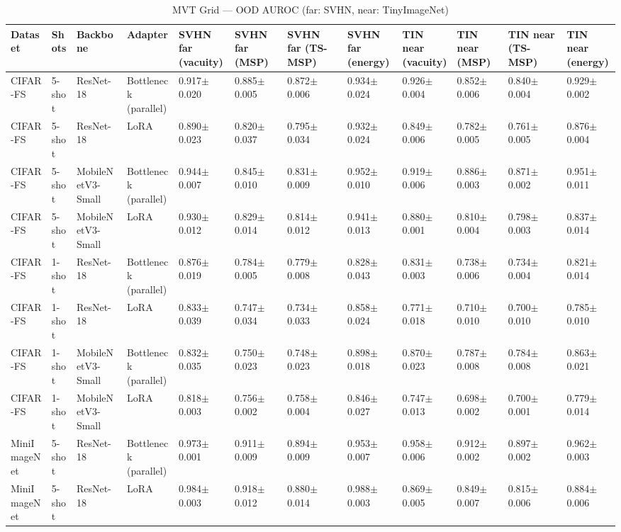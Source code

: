 \begin{table}[t]
\centering
\caption{MVT Grid — OOD AUROC (far: SVHN, near: TinyImageNet)}
\begin{tabular}{llllllllllll}
\toprule
Dataset & Shots & Backbone & Adapter & SVHN far (vacuity) & SVHN far (MSP) & SVHN far (TS-MSP) & SVHN far (energy) & TIN near (vacuity) & TIN near (MSP) & TIN near (TS-MSP) & TIN near (energy) \\
\midrule
CIFAR-FS & 5-shot & ResNet-18 & Bottleneck (parallel) & 0.917$\pm$0.020 & 0.885$\pm$0.005 & 0.872$\pm$0.006 & 0.934$\pm$0.024 & 0.926$\pm$0.004 & 0.852$\pm$0.006 & 0.840$\pm$0.004 & 0.929$\pm$0.002 \\
CIFAR-FS & 5-shot & ResNet-18 & LoRA & 0.890$\pm$0.023 & 0.820$\pm$0.037 & 0.795$\pm$0.034 & 0.932$\pm$0.024 & 0.849$\pm$0.006 & 0.782$\pm$0.005 & 0.761$\pm$0.005 & 0.876$\pm$0.004 \\
CIFAR-FS & 5-shot & MobileNetV3-Small & Bottleneck (parallel) & 0.944$\pm$0.007 & 0.845$\pm$0.010 & 0.831$\pm$0.009 & 0.952$\pm$0.010 & 0.919$\pm$0.006 & 0.886$\pm$0.003 & 0.871$\pm$0.002 & 0.951$\pm$0.011 \\
CIFAR-FS & 5-shot & MobileNetV3-Small & LoRA & 0.930$\pm$0.012 & 0.829$\pm$0.014 & 0.814$\pm$0.012 & 0.941$\pm$0.013 & 0.880$\pm$0.001 & 0.810$\pm$0.004 & 0.798$\pm$0.003 & 0.837$\pm$0.014 \\
CIFAR-FS & 1-shot & ResNet-18 & Bottleneck (parallel) & 0.876$\pm$0.019 & 0.784$\pm$0.005 & 0.779$\pm$0.008 & 0.828$\pm$0.043 & 0.831$\pm$0.003 & 0.738$\pm$0.006 & 0.734$\pm$0.004 & 0.821$\pm$0.014 \\
CIFAR-FS & 1-shot & ResNet-18 & LoRA & 0.833$\pm$0.039 & 0.747$\pm$0.034 & 0.734$\pm$0.033 & 0.858$\pm$0.024 & 0.771$\pm$0.018 & 0.710$\pm$0.010 & 0.700$\pm$0.010 & 0.785$\pm$0.010 \\
CIFAR-FS & 1-shot & MobileNetV3-Small & Bottleneck (parallel) & 0.832$\pm$0.035 & 0.750$\pm$0.023 & 0.748$\pm$0.023 & 0.898$\pm$0.018 & 0.870$\pm$0.023 & 0.787$\pm$0.008 & 0.784$\pm$0.008 & 0.863$\pm$0.021 \\
CIFAR-FS & 1-shot & MobileNetV3-Small & LoRA & 0.818$\pm$0.003 & 0.756$\pm$0.002 & 0.758$\pm$0.004 & 0.846$\pm$0.027 & 0.747$\pm$0.013 & 0.698$\pm$0.002 & 0.700$\pm$0.001 & 0.779$\pm$0.014 \\
MiniImageNet & 5-shot & ResNet-18 & Bottleneck (parallel) & 0.973$\pm$0.001 & 0.911$\pm$0.009 & 0.894$\pm$0.009 & 0.953$\pm$0.007 & 0.958$\pm$0.006 & 0.912$\pm$0.002 & 0.897$\pm$0.002 & 0.962$\pm$0.003 \\
MiniImageNet & 5-shot & ResNet-18 & LoRA & 0.984$\pm$0.003 & 0.918$\pm$0.012 & 0.880$\pm$0.014 & 0.988$\pm$0.003 & 0.869$\pm$0.005 & 0.849$\pm$0.007 & 0.815$\pm$0.006 & 0.884$\pm$0.006 \\

\end{tabular}
\end{table}
